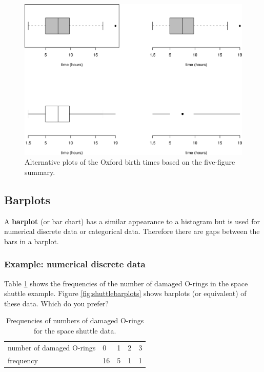 \documentclass[
  11pt,
  british,
  openany, a4paper]{book}
\begin{document}
\begin{figure}

{\centering \includegraphics[width=0.75\linewidth]{images/ox_box_adv} 

}

\caption{Alternative plots of the Oxford birth times based on the five-figure summary.}\label{fig:oxboxadv}
\end{figure}

\hypertarget{barplots}{%
\subsection{Barplots}\label{barplots}}

A \textbf{barplot} (or bar chart) has a similar appearance to a histogram but is used for numerical discrete data or categorical data. Therefore there are gaps between the bars in a barplot.

\hypertarget{example-numerical-discrete-data}{%
\subsubsection*{Example: numerical discrete data}\label{example-numerical-discrete-data}}

Table \ref{tab:shuttlenew} shows the frequencies of the number of damaged O-rings in the space shuttle example. Figure \ref{fig:shuttlebarplots} shows barplots (or equivalent) of these data. Which do you prefer?

\begin{table}

\caption{\label{tab:shuttlenew}Frequencies of numbers of damaged O-rings for the space shuttle data.}
\centering
\begin{tabular}[t]{lllll}
\toprule
number of damaged O-rings & 0 & 1 & 2 & 3\\
frequency & 16 & 5 & 1 & 1\\
\bottomrule
\end{tabular}
\end{table}
\end{document}
